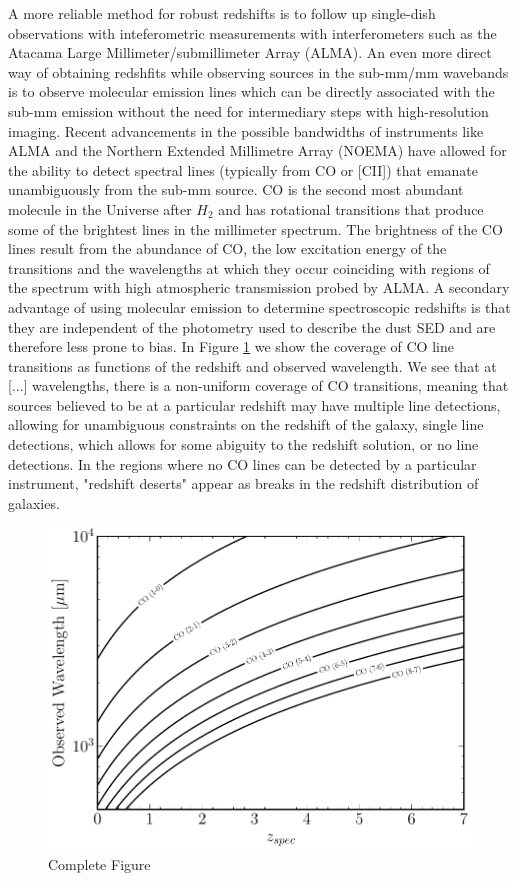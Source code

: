 A more reliable method for robust redshifts is to follow up single-dish observations with inteferometric measurements with interferometers such as the Atacama Large Millimeter/submillimeter Array (ALMA). An even more direct way of obtaining redshfits while observing sources in the sub-mm/mm wavebands is to observe molecular emission lines which can be directly associated with the sub-mm emission without the need for intermediary steps with high-resolution imaging. Recent advancements in the possible bandwidths of instruments like ALMA and the Northern Extended Millimetre Array (NOEMA) have allowed for the ability to detect spectral lines (typically from CO or [CII]) that emanate unambiguously from the sub-mm source. CO is the second most abundant molecule in the Universe after $H_2$ and has rotational transitions that produce some of the brightest lines in the millimeter spectrum. The brightness of the CO lines result from the abundance of CO, the low excitation energy of the transitions and the wavelengths at which they occur coinciding with regions of the spectrum with high atmospheric transmission probed by ALMA. A secondary advantage of using molecular emission to determine spectroscopic redshifts is that they are independent of the photometry used to describe the dust SED and are therefore less prone to bias. In Figure \ref{fig:redshift_ladder} we show the coverage of CO line transitions as functions of the redshift and observed wavelength. We see that at [...] wavelengths, there is a non-uniform coverage of CO transitions, meaning that sources believed to be at a particular redshift may have multiple line detections, allowing for unambiguous constraints on the redshift of the galaxy, single line detections, which allows for some abiguity to the redshift solution, or no line detections. In the regions where no CO lines can be detected by a particular instrument, "redshift deserts" appear as breaks in the redshift distribution of galaxies.

\begin{figure}
	\centering
	\includegraphics[width=0.75\columnwidth]{Figures/redshift_ladder.pdf}
	\caption{{\color{red} Complete Figure}}
	\label{fig:redshift_ladder}
\end{figure}

